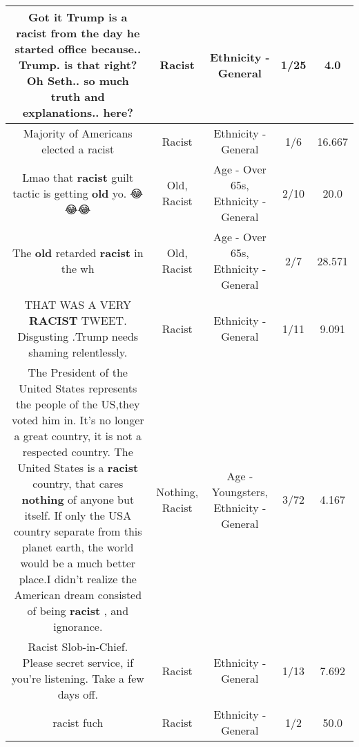 \documentclass[11pt]{article}
\newlength\mylength
\begin{document}
\begin{center}
\begin{longtable}{|C{.65\mylength}|C{.30\mylength}|C{.12\mylength}|C{.12\mylength}|C{.12\mylength}|}
  \small Got it Trump is a \textbf{racist} from the day he started office because.. Trump.  is that right?  Oh Seth..  so much truth and explanations.. here?\normalsize   & Racist & Ethnicity - General & 1/25 & 4.0 \\  \hline
  \small Majority of Americans elected a racist\normalsize   & Racist & Ethnicity - General & 1/6 & 16.667 \\  \hline
  \small Lmao that \textbf{racist} guilt tactic is getting \textbf{old} yo. 😂😂😂\normalsize   & Old, Racist & Age - Over 65s, Ethnicity - General & 2/10 & 20.0 \\  \hline
  \small The \textbf{old} retarded \textbf{racist} in the wh\normalsize   & Old, Racist & Age - Over 65s, Ethnicity - General & 2/7 & 28.571 \\  \hline
  \small THAT WAS A VERY \textbf{RACIST} TWEET.  Disgusting .Trump needs shaming relentlessly.\normalsize   & Racist & Ethnicity - General & 1/11 & 9.091 \\  \hline
  \small The President of the United States represents the people of the US,they voted him in. It's no longer a great country, it is not a respected country. The United States is a \textbf{racist} country, that cares \textbf{nothing} of anyone but itself. If only the USA country separate from this planet earth, the world would be a much better place.I didn't realize the American dream consisted of being \textbf{racist} , and ignorance.\normalsize   & Nothing, Racist & Age - Youngsters, Ethnicity - General & 3/72 & 4.167 \\  \hline
  \small Racist Slob-in-Chief. Please secret service, if you're listening. Take a few days off.\normalsize   & Racist & Ethnicity - General & 1/13 & 7.692 \\  \hline
  \small racist fuch\normalsize   & Racist & Ethnicity - General & 1/2 & 50.0 \\  \hline

\end{longtable}
\end{center}
\end{document}
